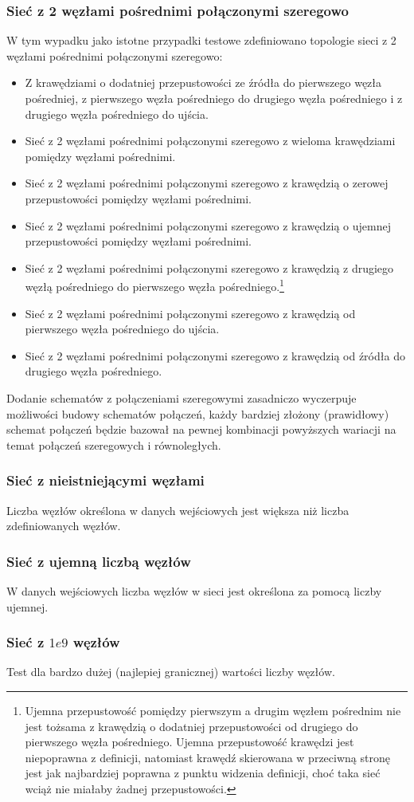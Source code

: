 \subsubsection{Sieć z 2 węzłami pośrednimi połączonymi szeregowo}
W tym wypadku jako istotne przypadki testowe zdefiniowano topologie
sieci z 2 węzłami pośrednimi połączonymi szeregowo:
\begin{itemize}[nosep]
    \item Z krawędziami o dodatniej przepustowości ze źródła do pierwszego węzła
    pośredniej, z pierwszego węzła pośredniego do drugiego węzła pośredniego i z
    drugiego węzła pośredniego do ujścia.
    \item Sieć z 2 węzłami pośrednimi połączonymi szeregowo z wieloma
    krawędziami pomiędzy węzłami pośrednimi.
    \item Sieć z 2 węzłami pośrednimi połączonymi szeregowo z krawędzią o
    zerowej przepustowości pomiędzy węzłami pośrednimi.
    \item Sieć z 2 węzłami pośrednimi połączonymi szeregowo z krawędzią o
    ujemnej przepustowości pomiędzy węzłami pośrednimi.
    \item Sieć z 2 węzłami pośrednimi połączonymi szeregowo z krawędzią z
    drugiego węzłą pośredniego do pierwszego węzła pośredniego.\footnote{Ujemna
    przepustowość pomiędzy pierwszym a drugim węzłem pośrednim nie jest tożsama
    z krawędzią o dodatniej przepustowości od drugiego do pierwszego węzła
    pośredniego. Ujemna przepustowość krawędzi jest niepoprawna z definicji,
    natomiast krawędź skierowana w przeciwną stronę jest jak najbardziej
    poprawna z punktu widzenia definicji, choć taka sieć wciąż nie miałaby
    żadnej przepustowości.}
    \item Sieć z 2 węzłami pośrednimi połączonymi szeregowo z krawędzią od
    pierwszego węzła pośredniego do ujścia.
    \item Sieć z 2 węzłami pośrednimi połączonymi szeregowo z krawędzią od
    źródła do drugiego węzła pośredniego.
\end{itemize}
Dodanie schematów z połączeniami szeregowymi zasadniczo wyczerpuje możliwości
budowy schematów połączeń, każdy bardziej złożony (prawidłowy) schemat połączeń
będzie bazował na pewnej kombinacji powyższych wariacji na temat połączeń
szeregowych i równoległych.

\subsubsection{Sieć z nieistniejącymi węzłami}
Liczba węzłów określona w danych wejściowych jest większa niż liczba
zdefiniowanych węzłów.

\subsubsection{Sieć z ujemną liczbą węzłów}
W danych wejściowych liczba węzłów w sieci jest określona za pomocą liczby
ujemnej.

\subsubsection{Sieć z $1e9$ węzłów}
Test dla bardzo dużej (najlepiej granicznej) wartości liczby węzłów.
